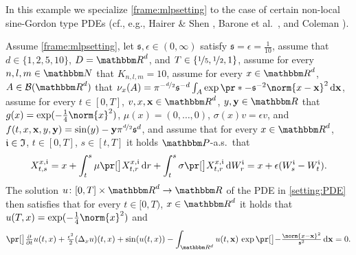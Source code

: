 \begin{example}

	\label{exampleMLP:sinegordon_nonlocal}
	In this example we specialize \cref{frame:mlpsetting} to the case of certain non-local sine-Gordon type PDEs (cf., e.g., Hairer \& Shen \cite{Hairer2016}, Barone et al.~\cite{Barone1971}, and Coleman \cite{Coleman1994}).

	Assume 
		\cref{frame:mlpsetting},
	let
		$\mathfrak s,\epsilon\in(0,\infty)$
	satisfy 
		$\mathfrak{s} = \epsilon = \tfrac{1}{10}$,
	assume that
		$d\in\{1,2,5,10\}$,
		$D = \R^d$, 
		and	$T\in\{\nicefrac{1}{5},\nicefrac{1}{2},1\}$,
	assume for every 
		$n,l,m\in \N$ 
	that
		$K_{n,l,m} = 10$,
	assume for every
		$x \in \R^d$,
		$A \in \mathcal{B}(\R^d)$
	that
		$\nu_x(A) = \pi^{-\nicefrac{d}{2}}\mathfrak{s}^{-d}\int_A \exp\pr*{-\mathfrak{s}^{-2}\norm{x - \mathbf{x}}^2}\,\diff\mathbf{x}$,
	assume for every 
		$t \in [0,T]$,
		$v,x,\mathbf{x} \in \R^d$,
		$y,\mathbf{y} \in \R$
	that
		$g(x)= \exp (- \tfrac{1}{4}\norm{x}^2)$,
		$\mu(x)=(0,\dots,0)$,
		$\sigma(x) v = \epsilon v$, and
		$f(t,x,\mathbf{x},y,\mathbf{y})= \sin(y) -\mathbf{y}\pi^{\nicefrac{d}{2}}\mathfrak{s}^d$,
	and	assume that for every 
		$x\in \R^{d}$, 
		$\mathfrak{i} \in \mathfrak{I}$, 
		$t\in [0,T]$, 
		$s\in [t,T]$ 
	it holds $\P$-a.s.\ that
	\begin{equation}
		X^{x,\dindex}_{t,s} 
		= 
		x + \int_{t}^{s} \mu\bpr{X^{x,\dindex}_{t,r}} \, \diff r + \int^{s}_{t} \sigma \bpr{X^{x,\dindex}_{t,r}} \, \diff W^{\dindex}_{r}
		=
		x+\epsilon(W^\dindex_s-W^\dindex_t)
		.
	\end{equation}
	The solution 
		$u\colon[0,T]\times \R^d \to \R$ 
		of the PDE in \eqref{setting:PDE} then satisfies that for every
			$t\in [0,T)$, 
			$x\in\R^d$
		it holds that
			$u(T,x) = \exp (-\tfrac{1}{4}\norm{x}^2)$ and
		\begin{equation}
			\label{eqMLP:sinegordon_nonlocal}
			\bpr{\tfrac{\partial}{\partial t}u}(t,x)
			+
			\tfrac{\epsilon^2}{2}(\Delta_x u)(t,x) 
			+ 
			\sin ( u(t,x) ) 
			- 
			\int_{\R^d} u(t,\mathbf{x})\, \exp\bpr{-\tfrac{\norm{x-\mathbf{x}}^2}{\mathfrak{s}^2}}\,\diff \mathbf{x} 
			=
			0
			.
		\end{equation}
\end{example}

